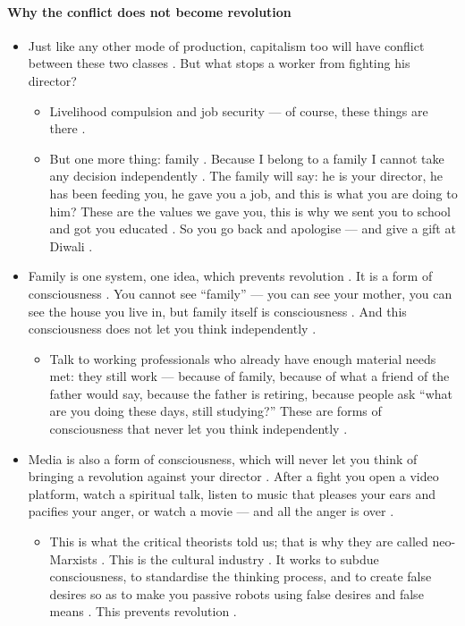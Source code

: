 \paragraph{Why the conflict does not become revolution}
\begin{itemize}
    \item Just like any other mode of production, capitalism too will have conflict between these two classes . But what stops a worker from fighting his director? 
    \begin{itemize}
        \item Livelihood compulsion and job security --- of course, these things are there .
        \item But one more thing: family . Because I belong to a family I cannot take any decision independently . The family will say: he is your director, he has been feeding you, he gave you a job, and this is what you are doing to him?  These are the values we gave you, this is why we sent you to school and got you educated . So you go back and apologise --- and give a gift at Diwali .
    \end{itemize}
    \item Family is one system, one idea, which prevents revolution . It is a form of consciousness . You cannot see ``family'' --- you can see your mother, you can see the house you live in, but family itself is consciousness . And this consciousness does not let you think independently .
    \begin{itemize}
        \item Talk to working professionals who already have enough material needs met: they still work --- because of family, because of what a friend of the father would say, because the father is retiring, because people ask ``what are you doing these days, still studying?''  These are forms of consciousness that never let you think independently .
    \end{itemize}
    \item Media is also a form of consciousness, which will never let you think of bringing a revolution against your director . After a fight you open a video platform, watch a spiritual talk, listen to music that pleases your ears and pacifies your anger, or watch a movie --- and all the anger is over .
    \begin{itemize}
        \item This is what the critical theorists told us; that is why they are called neo-Marxists . This is the cultural industry . It works to subdue consciousness, to standardise the thinking process, and to create false desires so as to make you passive robots using false desires and false means . This prevents revolution .
    \end{itemize}
\end{itemize}


